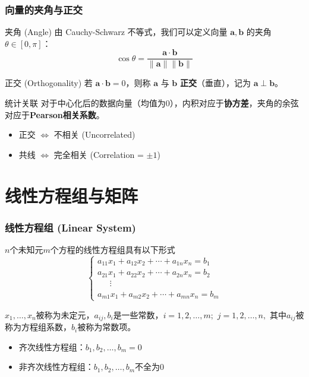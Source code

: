 \begin{frame}
\frametitle{向量的夹角与正交}

\begin{block}{夹角 (Angle)}
由 Cauchy-Schwarz 不等式，我们可以定义向量 $\mathbf{a}, \mathbf{b}$ 的夹角 $\theta \in [0, \pi]$：
\[
\cos \theta = \frac{\mathbf{a} \cdot \mathbf{b}}{\|\mathbf{a}\| \|\mathbf{b}\|}
\]
\end{block}

\pause

\begin{block}{正交 (Orthogonality)}
若 $\mathbf{a} \cdot \mathbf{b} = 0$，则称 $\mathbf{a}$ 与 $\mathbf{b}$ \textbf{正交}（垂直），记为 $\mathbf{a} \perp \mathbf{b}$。
\end{block}

\begin{alertblock}{统计关联}
对于中心化后的数据向量（均值为0），内积对应于\textbf{协方差}，夹角的余弦对应于\textbf{Pearson相关系数}。
\begin{itemize}
    \item 正交 $\iff$ 不相关 (Uncorrelated)
    \item 共线 $\iff$ 完全相关 (Correlation = $\pm 1$)
\end{itemize}
\end{alertblock}

\end{frame}


\section{线性方程组与矩阵}


\begin{frame}
\frametitle{线性方程组 (Linear System)}

$n$个未知元$m$个方程的线性方程组具有以下形式
\[
\begin{cases}
a_{11}x_1 + a_{12}x_2 + \cdots + a_{1n}x_n = b_1 \\
a_{21}x_1 + a_{22}x_2 + \cdots + a_{2n}x_n = b_2 \\
\phantom{yyy} \vdots \\
a_{m1}x_1 + a_{m2}x_2 + \cdots + a_{mn}x_n = b_m
\end{cases}\]

\pause

$x_1,\ldots,x_n$被称为未定元，$a_{ij},b_i$是一些常数，$i=1,2,\ldots,m;$ $j = 1,2,\ldots,n,$ 其中$a_{ij}$被称为方程组系数，$b_i$被称为常数项。

\pause

\begin{itemize}
\item 齐次线性方程组：$b_1,b_2,\ldots,b_m = 0$
\item 非齐次线性方程组：$b_1,b_2,\ldots,b_m$不全为$0$
\end{itemize}

\end{frame}

